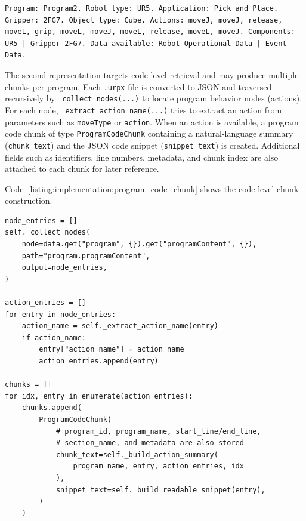 \begin{listing}[H]
	\begin{verbatim}
Program: Program2. Robot type: UR5. Application: Pick and Place. Gripper: 2FG7. Object type: Cube. Actions: moveJ, moveJ, release, moveL, grip, moveL, moveJ, moveL, release, moveL, moveJ. Components: UR5 | Gripper 2FG7. Data available: Robot Operational Data | Event Data.
	\end{verbatim}
	\caption{Example of a metadata chunk.}
	\label{listing:implementation:program_metadata_example}
\end{listing}

The second representation targets code-level retrieval and may produce multiple chunks per program. Each \texttt{.urpx} file is converted to JSON and traversed recursively by \texttt{\_collect\_nodes(...)} to locate program behavior nodes (actions). For each node, \texttt{\_extract\_action\_name(...)} tries to extract an action from parameters such as \texttt{moveType} or \texttt{action}. When an action is available, a program code chunk of type \texttt{ProgramCodeChunk} containing a natural-language summary (\texttt{chunk\_text}) and the JSON code snippet (\texttt{snippet\_text}) is created. Additional fields such as identifiers, line numbers, metadata, and chunk index are also attached to each chunk for later reference.

Code~\ref{listing:implementation:program_code_chunk} shows the code-level chunk construction.

\begin{listing}[H]
	\begin{verbatim}
node_entries = []
self._collect_nodes(
	node=data.get("program", {}).get("programContent", {}),
	path="program.programContent",
	output=node_entries,
)

action_entries = []
for entry in node_entries:
	action_name = self._extract_action_name(entry)
	if action_name:
		entry["action_name"] = action_name
		action_entries.append(entry)

chunks = []
for idx, entry in enumerate(action_entries):
	chunks.append(
		ProgramCodeChunk(
			# program_id, program_name, start_line/end_line,
			# section_name, and metadata are also stored
			chunk_text=self._build_action_summary(
				program_name, entry, action_entries, idx
			),
			snippet_text=self._build_readable_snippet(entry),
		)
	)
	\end{verbatim}
	\caption{Program code chunk construction.}
	\label{listing:implementation:program_code_chunk}
\end{listing}

